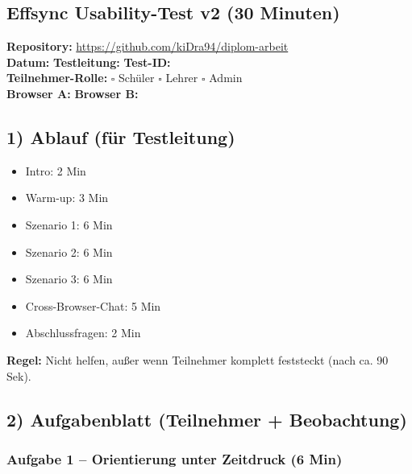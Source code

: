 
\subsection*{Effsync Usability-Test v2 (30 Minuten)}

\noindent
\textbf{Repository:} \url{https://github.com/kiDra94/diplom-arbeit} \\
\textbf{Datum:} \underline{\hspace{4cm}} \quad
\textbf{Testleitung:} \underline{\hspace{4cm}} \quad
\textbf{Test-ID:} \underline{\hspace{3cm}} \\
\textbf{Teilnehmer-Rolle:} $\square$ Schüler \quad $\square$ Lehrer \quad $\square$ Admin \\
\textbf{Browser A:} \underline{\hspace{3cm}} \quad
\textbf{Browser B:} \underline{\hspace{3cm}}

\subsection*{1) Ablauf (für Testleitung)}

\begin{itemize}
    \item Intro: 2 Min
    \item Warm-up: 3 Min
    \item Szenario 1: 6 Min
    \item Szenario 2: 6 Min
    \item Szenario 3: 6 Min
    \item Cross-Browser-Chat: 5 Min
    \item Abschlussfragen: 2 Min
\end{itemize}

\noindent\textbf{Regel:} Nicht helfen, außer wenn Teilnehmer komplett feststeckt (nach ca. 90 Sek).

\subsection*{2) Aufgabenblatt (Teilnehmer + Beobachtung)}

\subsubsection*{Aufgabe 1 – Orientierung unter Zeitdruck (6 Min)}


